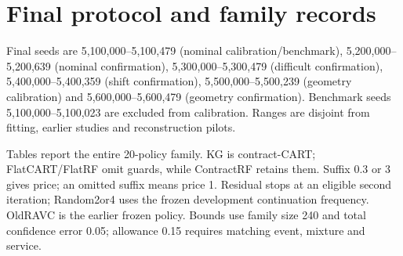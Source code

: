 
\section{Final protocol and family records}\label{supp:final}
Final seeds are 5,100,000--5,100,479 (nominal calibration/benchmark), 5,200,000--5,200,639 (nominal confirmation), 5,300,000--5,300,479 (difficult confirmation), 5,400,000--5,400,359 (shift confirmation), 5,500,000--5,500,239 (geometry calibration) and 5,600,000--5,600,479 (geometry confirmation). Benchmark seeds 5,100,000--5,100,023 are excluded from calibration. Ranges are disjoint from fitting, earlier studies and reconstruction pilots.

Tables report the entire 20-policy family. KG is contract-CART; FlatCART/FlatRF omit guards, while ContractRF retains them. Suffix 0.3 or 3 gives price; an omitted suffix means price 1. Residual stops at an eligible second iteration; Random2or4 uses the frozen development continuation frequency. OldRAVC is the earlier frozen policy. Bounds use family size 240 and total confidence error 0.05; allowance 0.15 requires matching event, mixture and service.
